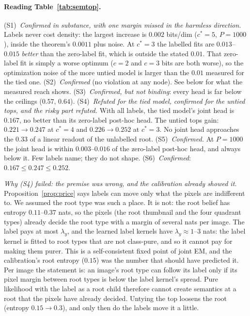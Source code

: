 \documentclass[11pt]{article}
\theoremstyle{definition}
\begin{document}
\paragraph{Reading Table~\ref{tab:semtop}.}
(S1)~\emph{Confirmed in substance, with one margin missed in the harmless direction.} Labels never cost density: the
largest increase is $0.002$ bits/dim ($c^*=5$, $P=1000$), inside the theorem's $0.0011$ plus noise. At $c^*=3$ the
labelled fits are $0.013$--$0.015$ \emph{better} than the zero-label fit, which is outside the stated $0.01$. That
zero-label fit is simply a worse optimum ($c=2$ and $c=3$ bits are both worse), so the optimization noise of the more
untied model is larger than the $0.01$ measured for the tied one.
(S2)~\emph{Confirmed} (no violation at any node). See below for what the measured reach shows.
(S3)~\emph{Confirmed, but not binding}: every head is far below the ceilings ($0.57$, $0.64$).
(S4)~\emph{Refuted for the tied model, confirmed for the untied tops, and the risky part refuted.} With all labels, the
tied model's joint head is $0.167$, no better than its zero-label post-hoc head. The untied tops gain: $0.221\to0.247$ at
$c^*=4$ and $0.226\to0.252$ at $c^*=3$. No joint head approaches the $0.33$ of a linear readout of the unlabelled root.
(S5)~\emph{Confirmed.} At $P=1000$ the joint head is within $0.003$--$0.016$ of the zero-label post-hoc head, and always
below it. Few labels name; they do not shape.
(S6)~\emph{Confirmed}: $0.167\le0.247\le0.252$.

\emph{Why (S4) failed: the premise was wrong, and the calibration already showed it.} Proposition~\ref{prop:price} says
labels can move only what the pixels are indifferent to. We assumed the root type was such a place. It is not: the
root belief has entropy $0.11$--$0.37$ nats, so the pixels (the root thumbnail and the four quadrant types) already
decide the root type with a margin of several nats per image. The label pays at most $\lambda_y$, and the learned label
kernels have $\lambda_y\approx1$--$3$ nats: the label kernel is fitted to root types that are not class-pure, and so it
cannot pay for making them purer. This is a self-consistent fixed point of joint EM, and the calibration's root entropy
($0.15$) was the number that should have predicted it. Per image the statement is: an image's root type can follow
its label only if its pixel margin between root types is below the label kernel's spread. Pure likelihood with the label
as a root child therefore cannot create semantics at a root that the pixels have already decided. Untying the top
loosens the root (entropy $0.15\to0.3$), and only then do the labels move it a little.
\end{document}
